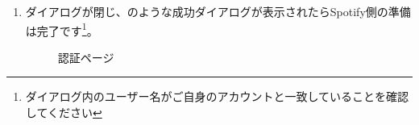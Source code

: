 \begin{enumerate}
            \newpage
            \item ダイアログが閉じ、のような成功ダイアログが表示されたらSpotify側の準備は完了です\footnote{ダイアログ内のユーザー名がご自身のアカウントと一致していることを確認してください}。
                \begin{figure}[htbp]
                    \centering
                    \caption{認証ページ}
                    \label{img:spotify16}
                \end{figure}
        \end{enumerate}

    \newpage
